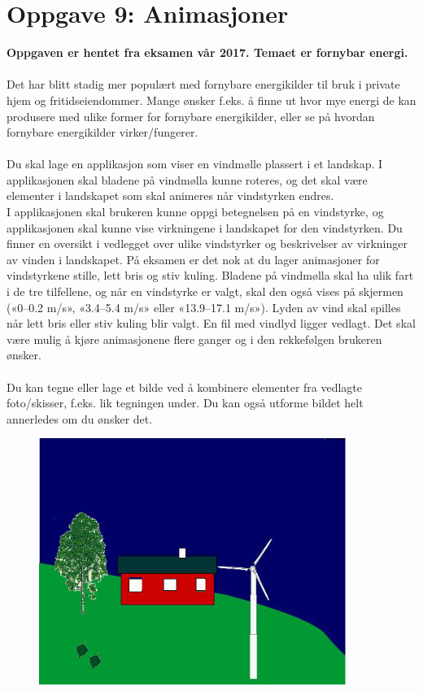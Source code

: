 \documentclass[a4paper, norsk, 10pt]{article}
\begin{document}
\section*{Oppgave 9: Animasjoner}
\textbf{Oppgaven er hentet fra eksamen vår 2017. Temaet er fornybar energi.}\\
\ \\
Det har blitt stadig mer populært med fornybare energikilder til bruk i private hjem og fritidseiendommer. Mange ønsker f.eks. å finne ut hvor mye energi de kan produsere med ulike former for fornybare energikilder, eller se på hvordan fornybare energikilder virker/fungerer.\\
\ \\
Du skal lage en applikasjon som viser en vindmølle plassert i et landskap. I applikasjonen skal bladene på vindmølla kunne roteres, og det skal være elementer i landskapet som skal animeres når vindstyrken endres.\\
I applikasjonen skal brukeren kunne oppgi betegnelsen på en vindstyrke, og applikasjonen skal kunne vise virkningene i landskapet for den vindstyrken. Du finner en oversikt i vedlegget over ulike vindstyrker og beskrivelser av virkninger av vinden i landskapet. På eksamen er det nok at du lager animasjoner for vindstyrkene stille, lett bris og stiv kuling. Bladene på vindmølla skal ha ulik fart i de tre tilfellene, og når en vindstyrke er valgt, skal den også vises på skjermen («0–0.2 m/s», «3.4–5.4 m/s» eller «13.9–17.1 m/s»). Lyden av vind skal spilles når lett bris eller stiv kuling blir valgt. En fil med vindlyd ligger vedlagt. Det skal være mulig å kjøre animasjonene flere ganger og i den rekkefølgen brukeren ønsker.\\
\ \\
Du kan tegne eller lage et bilde ved å kombinere elementer fra vedlagte foto/skisser, f.eks. lik tegningen under. Du kan også utforme bildet helt annerledes om du ønsker det.\\
\begin{figure}[h!]
\includegraphics[width=10cm]{v17.png}
\end{figure}
\end{document}
